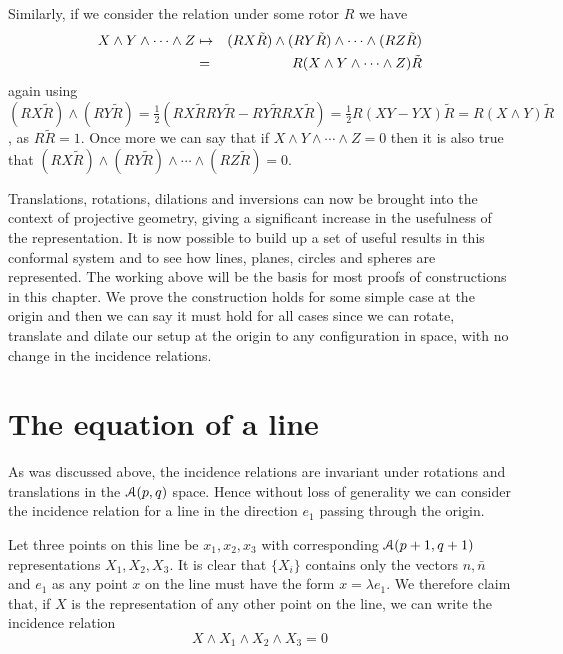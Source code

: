 Similarly, if we consider the relation under some rotor $R$ we have
%
\begin{eqnarray}
   X \wedge Y \wedge \cdots  \wedge Z & \mapsto & (RX\tilde{R}) \wedge (RY\tilde{R}) \wedge \cdots
\wedge (RZ\tilde{R}) \nonumber \\
   & = & R( X \wedge Y \wedge \cdots  \wedge Z)\tilde{R} \nonumber
\end{eqnarray}
%
again using $(RX\tilde{R})\wedge (RY\tilde{R}) =
\frac{1}{2}(RX\tilde{R} RY\tilde{R} - RY\tilde{R} RX\tilde{R}) =
\frac{1}{2}R(XY-YX)\tilde{R} = R(X\wedge Y)\tilde{R}$, as
$R\tilde{R}=1$. Once more we can say that if $X\wedge Y\wedge \cdots \wedge Z=0$ then 
it is also true that  $(RX\tilde{R})\wedge (RY\tilde{R})\wedge \cdots \wedge (RZ\tilde{R})=0$.

Translations, rotations, dilations and inversions
can now be brought into the context of projective geometry, giving a
significant increase in the usefulness of the representation. It is now
possible to build up a set of useful results in this conformal system and to
see how lines, planes, circles and spheres are represented. The working above
will be
the basis for most proofs of constructions in this chapter. We prove the
construction holds for some simple case at the origin and then we can say it
must  hold for all cases since we can rotate, translate and dilate our setup at
the origin to any configuration in space, with no change in the incidence
relations.

\section{The equation of a line}

As was discussed above, the incidence relations are invariant under rotations
and translations in the ${\mathcal{A}}(p,q)$ space. Hence without loss of
generality we can consider the incidence relation for a line in the direction
$e_1$ passing through the origin.

Let three points on this line be $x_1,x_2,x_3$ with corresponding
${\mathcal{A}}(p+1,q+1)$ representations $X_1,X_2,X_3$. It is clear that $\{X_i\}$
contains only the vectors $n,\bar{n}$ and $e_1$ as any point $x$ on the line
must have the form $x = \lambda e_1$.  We therefore claim that, if $X$ is the
representation of any other point on the line, we can write the incidence 
relation
%
\[ X\wedge X_1 \wedge X_2 \wedge X_3 = 0  \]
%

